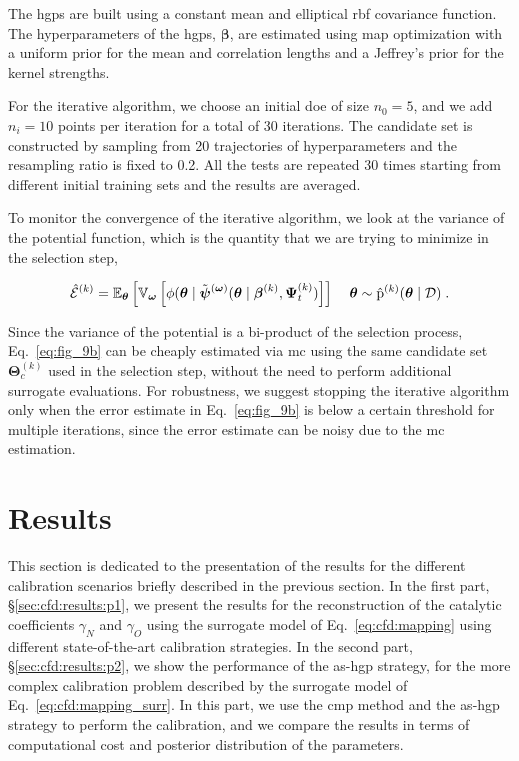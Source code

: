 \smallskip
The \glspl{hgp} are built using a constant mean and elliptical \gls{rbf} covariance function. The hyperparameters of the \glspl{hgp}, $\boldsymbol{\beta}$, are estimated using \gls{map} optimization with a uniform prior for the mean and correlation lengths and a Jeffrey's prior for the kernel strengths.

\bigskip
For the iterative algorithm, we choose an initial \gls{doe} of size $n_0=5$, and we add $n_i = 10$ points per iteration for a total of 30 iterations. The candidate set is constructed by sampling from 20 trajectories of hyperparameters and the resampling ratio is fixed to 0.2. All the tests are repeated 30 times starting from different initial training sets and the results are averaged.

\smallskip
To monitor the convergence of the iterative algorithm, we look at the variance of the potential function, which is the quantity that we are trying to minimize in the selection step,

\begin{equation}
    \hat{\mathcal{E}}^{(k)} = \mathbb{E}_{\boldsymbol{\theta}} \left[ \mathbb{V}_{\boldsymbol{\omega}} \left[ \phi(\boldsymbol{\theta} \mid \tilde{\boldsymbol{\psi}}^{(\boldsymbol{\omega}) }(\boldsymbol{\theta} \mid \boldsymbol{\beta}^{(k)}, \boldsymbol{\Psi}_t^{(k)})\right]\right]\;\;\;\; \boldsymbol{\theta} \sim \hat{\mathrm{p}}^{(k)}(\boldsymbol{\theta} \mid \mathcal{D})\;.
    \label{eq:fig_9b}
\end{equation}

Since the variance of the potential is a bi-product of the selection process, Eq.~\eqref{eq:fig_9b} can be cheaply estimated via \gls{mc} using the same candidate set $\boldsymbol{\Theta}_c^{(k)}$ used in the selection step, without the need to perform additional surrogate evaluations. For robustness, we suggest stopping the iterative algorithm only when the error estimate in Eq.~\eqref{eq:fig_9b} is below a certain threshold for multiple iterations, since the error estimate can be noisy due to the \gls{mc} estimation.

\section{Results}
\label{sc:cfd:results}

This section is dedicated to the presentation of the results for the different calibration scenarios briefly described in the previous section. In the first part, \S\ref{sec:cfd:results:p1}, we present the results for the reconstruction of the catalytic coefficients $\gamma_N$ and $\gamma_O$ using the surrogate model of Eq.~\eqref{eq:cfd:mapping} using different state-of-the-art calibration strategies. In the second part, \S\ref{sec:cfd:results:p2}, we show the performance of the \gls{as}-\gls{hgp} strategy, for the more complex calibration problem described by the surrogate model of Eq.~\eqref{eq:cfd:mapping_surr}. In this part, we use the \gls{cmp} method and the \gls{as}-\gls{hgp} strategy to perform the calibration, and we compare the results in terms of computational cost and posterior distribution of the parameters.

